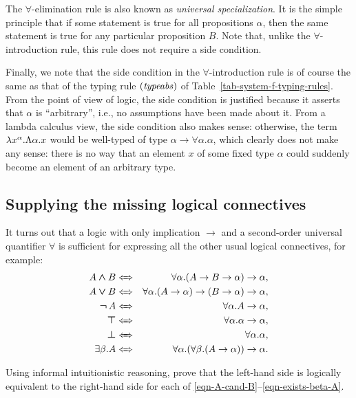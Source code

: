 \documentclass{article}
\begin{document}
The $\forall$-elimination rule is also known as {\em universal
  specialization}. It is the simple principle that if some statement
is true for all propositions $\alpha$, then the same statement is true for
any particular proposition $B$. Note that, unlike the $\forall$-introduction
rule, this rule does not require a side condition. 

Finally, we note that the side condition in the $\forall$-introduction
rule is of course the same as that of the typing rule $\textrm{(\textit{typeabs\/})}$ of
Table~\ref{tab-system-f-typing-rules}. From the point of view of
logic, the side condition is justified because it asserts that
$\alpha$ is ``arbitrary'', i.e., no assumptions have been made about
it. From a lambda calculus view, the side condition also makes sense:
otherwise, the term $\lambda x^{\alpha}.\Lambda\alpha.x$ would be
well-typed of type $\alpha\to\forall\alpha.\alpha$, which clearly does
not make any sense: there is no way that an element $x$ of some fixed
type $\alpha$ could suddenly become an element of an arbitrary type. 

\subsection{Supplying the missing logical connectives}

It turns out that a logic with only implication $\to$ and a
second-order universal quantifier $\forall$ is sufficient for
expressing all the other usual logical connectives, for example:
\begin{eqnarray}
  A\cand B &\iff& \forall\alpha.(A\to B\to\alpha)\to\alpha,\label{eqn-A-cand-B}\\
  A\cor B &\iff& \forall\alpha.(A\to\alpha)\to(B\to\alpha)\to\alpha,\label{eqn-A-cor-B}\\
  \cnot A &\iff& \forall\alpha.A\to \alpha,\\
  \ctrue &\iff& \forall\alpha.\alpha\to\alpha,\\
  \cfalse &\iff& \forall\alpha.\alpha,\\
  \exists\beta.A &\iff& \forall\alpha.(\forall\beta.(A\to\alpha))\to\alpha.\label{eqn-exists-beta-A}
\end{eqnarray}

\begin{exercise}
  Using informal intuitionistic reasoning, prove that the left-hand side
  is logically equivalent to the right-hand side for each of
  {\eqref{eqn-A-cand-B}}--{\eqref{eqn-exists-beta-A}}.
\end{exercise}
\end{document}

